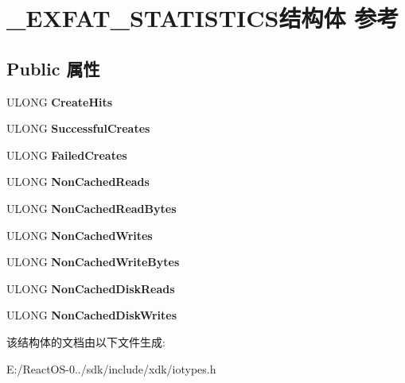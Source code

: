 \hypertarget{struct___e_x_f_a_t___s_t_a_t_i_s_t_i_c_s}{}\section{\+\_\+\+E\+X\+F\+A\+T\+\_\+\+S\+T\+A\+T\+I\+S\+T\+I\+C\+S结构体 参考}
\label{struct___e_x_f_a_t___s_t_a_t_i_s_t_i_c_s}
\subsection*{Public 属性}
\begin{DoxyCompactItemize}
\item 
\mbox{\label{struct___e_x_f_a_t___s_t_a_t_i_s_t_i_c_s_a109e0bf7f4794820f2bc8f3cc7e27e8a}} 
U\+L\+O\+NG {\bfseries Create\+Hits}
\item 
\mbox{\label{struct___e_x_f_a_t___s_t_a_t_i_s_t_i_c_s_a07b161d8eb418132eda13dacd2ff8d5e}} 
U\+L\+O\+NG {\bfseries Successful\+Creates}
\item 
\mbox{\label{struct___e_x_f_a_t___s_t_a_t_i_s_t_i_c_s_a1467b841b51b8c3f2ac4f65cf066f7f5}} 
U\+L\+O\+NG {\bfseries Failed\+Creates}
\item 
\mbox{\label{struct___e_x_f_a_t___s_t_a_t_i_s_t_i_c_s_a4716c4f5b9e8920a9f9ee4ef75413a6e}} 
U\+L\+O\+NG {\bfseries Non\+Cached\+Reads}
\item 
\mbox{\label{struct___e_x_f_a_t___s_t_a_t_i_s_t_i_c_s_ac957cb7b6687c93f285cc30679a813e9}} 
U\+L\+O\+NG {\bfseries Non\+Cached\+Read\+Bytes}
\item 
\mbox{\label{struct___e_x_f_a_t___s_t_a_t_i_s_t_i_c_s_ac330b538ecfada17d1b1d1af82361ef2}} 
U\+L\+O\+NG {\bfseries Non\+Cached\+Writes}
\item 
\mbox{\label{struct___e_x_f_a_t___s_t_a_t_i_s_t_i_c_s_a04e100ff124d39a4b9de2cf150df6710}} 
U\+L\+O\+NG {\bfseries Non\+Cached\+Write\+Bytes}
\item 
\mbox{\label{struct___e_x_f_a_t___s_t_a_t_i_s_t_i_c_s_a9a4412139a72926cb4b423844d63eaef}} 
U\+L\+O\+NG {\bfseries Non\+Cached\+Disk\+Reads}
\item 
\mbox{\label{struct___e_x_f_a_t___s_t_a_t_i_s_t_i_c_s_a068cda2f0ca854b465b725821ef66267}} 
U\+L\+O\+NG {\bfseries Non\+Cached\+Disk\+Writes}
\end{DoxyCompactItemize}


该结构体的文档由以下文件生成\+:\begin{DoxyCompactItemize}
\item 
E\+:/\+React\+O\+S-\/0../sdk/include/xdk/iotypes.\+h\end{DoxyCompactItemize}
